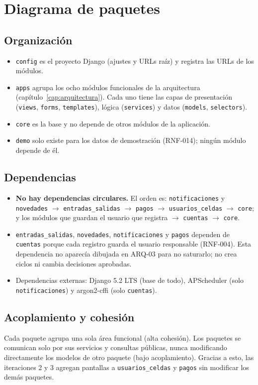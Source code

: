 \chapter{Diagrama de paquetes}\label{cap:paquetes}


\section{Organización}
\begin{itemize}
  \item \texttt{config} es el proyecto Django (ajustes y URLs raíz) y registra las URLs de los módulos.
  \item \texttt{apps} agrupa los ocho módulos funcionales de la arquitectura (capítulo~\ref{cap:arquitectura}). Cada uno tiene las capas de presentación (\texttt{views}, \texttt{forms}, \texttt{templates}), lógica (\texttt{services}) y datos (\texttt{models}, \texttt{selectors}).
  \item \texttt{core} es la base y no depende de otros módulos de la aplicación.
  \item \texttt{demo} solo existe para los datos de demostración (RNF-014); ningún módulo depende de él.
\end{itemize}

\section{Dependencias}
\begin{itemize}
  \item \textbf{No hay dependencias circulares.} El orden es: \texttt{notificaciones} y \texttt{novedades} $\rightarrow$ \texttt{entradas\_salidas} $\rightarrow$ \texttt{pagos} $\rightarrow$ \texttt{usuarios\_celdas} $\rightarrow$ \texttt{core}; y los módulos que guardan el usuario que registra $\rightarrow$ \texttt{cuentas} $\rightarrow$ \texttt{core}.
  \item \texttt{entradas\_salidas}, \texttt{novedades}, \texttt{notificaciones} y \texttt{pagos} dependen de \texttt{cuentas} porque cada registro guarda el usuario responsable (RNF-004). Esta dependencia no aparecía dibujada en ARQ-03 para no saturarlo; no crea ciclos ni cambia decisiones aprobadas.
  \item Dependencias externas: Django 5.2 LTS (base de todo), APScheduler (solo \texttt{notificaciones}) y argon2-cffi (solo \texttt{cuentas}).
\end{itemize}

\section{Acoplamiento y cohesión}
Cada paquete agrupa una sola área funcional (alta cohesión). Los paquetes se comunican solo por sus servicios y consultas públicas, nunca modificando directamente los modelos de otro paquete (bajo acoplamiento). Gracias a esto, las iteraciones 2 y 3 agregan pantallas a \texttt{usuarios\_celdas} y \texttt{pagos} sin modificar los demás paquetes.
